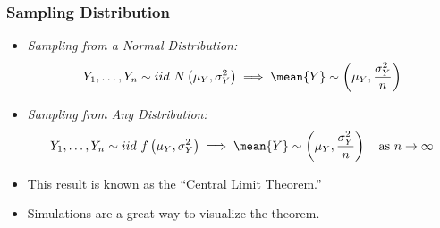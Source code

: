 \begin{frame}
\frametitle{Sampling Distribution}
\begin{itemize}
\item \emph{Sampling from a Normal Distribution:} 
\begin{align*}
Y_1, \ldots, Y_n \sim iid ~ N\left(\mu_Y, \sigma^2_Y\right)
\implies 
\mean{Y} \sim \left(\mu_Y,\dfrac{\sigma^2_Y}{n}\right)
\end{align*}
\item \emph{Sampling from Any Distribution:}
\begin{align*}
Y_1, \ldots, Y_n \sim iid ~ f\left(\mu_Y, \sigma^2_Y\right)
\implies 
\mean{Y} \sim \left(\mu_Y,\dfrac{\sigma^2_Y}{n}\right) \quad\text{as}~n\to\infty
\end{align*}
\item This result is known as the ``Central Limit Theorem.''
\item Simulations are a great way to visualize the theorem.
\end{itemize}
\end{frame}

